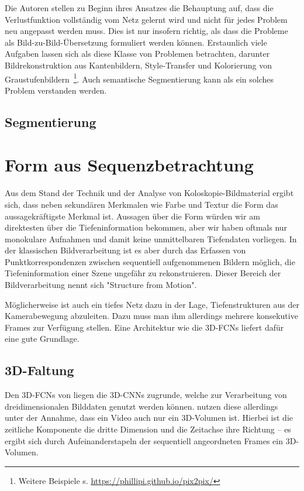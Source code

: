 Die Autoren stellen zu Beginn ihres Ansatzes die Behauptung auf, dass die Verlustfunktion vollständig vom Netz gelernt wird und nicht für jedes Problem neu angepasst werden muss.
Dies ist nur insofern richtig, als dass die Probleme als Bild-zu-Bild-Übersetzung formuliert werden können.
Erstaunlich viele Aufgaben lassen sich als diese Klasse von Problemen betrachten, darunter Bildrekonstruktion aus Kantenbildern, Style-Transfer und Kolorierung von Graustufenbildern~\footnote{Weitere Beispiele s. \url{https://phillipi.github.io/pix2pix/}}.
Auch semantische Segmentierung kann als ein solches Problem verstanden werden.



\subsection{Segmentierung}





\section{Form aus Sequenzbetrachtung}

Aus dem Stand der Technik und der Analyse von Koloskopie-Bildmaterial ergibt sich, dass neben sekundären Merkmalen wie Farbe und Textur die Form das aussagekräftigste Merkmal ist.
Aussagen über die Form würden wir am direktesten über die Tiefeninformation bekommen, aber wir haben oftmals nur monokulare Aufnahmen und damit keine unmittelbaren Tiefendaten vorliegen.
In der klassischen Bildverarbeitung ist es aber durch das Erfassen von Punktkorrespondenzen zwischen sequentiell aufgenommenen Bildern möglich, die Tiefeninformation einer Szene ungefähr zu rekonstruieren.
Dieser Bereich der Bildverarbeitung nennt sich "Structure from Motion".

Möglicherweise ist auch ein tiefes Netz dazu in der Lage, Tiefenstrukturen aus der Kamerabewegung abzuleiten.
Dazu muss man ihm allerdings mehrere konsekutive Frames zur Verfügung stellen.
Eine Architektur wie die 3D-FCNs liefert dafür eine gute Grundlage.

\subsection{3D-Faltung}

Den 3D-FCNs von \cite{Lequan.2017} liegen die 3D-CNNs zugrunde, welche zur Verarbeitung von dreidimensionalen Bilddaten genutzt werden können.
\citeauthor{Lequan.2017} nutzen diese allerdings unter der Annahme, dass ein Video auch nur ein 3D-Volumen ist.
Hierbei ist die zeitliche Komponente die dritte Dimension und die Zeitachse ihre Richtung -- es ergibt sich durch Aufeinanderstapeln der sequentiell angeordneten Frames ein 3D-Volumen.

